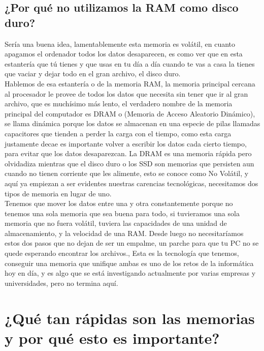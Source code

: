 \documentclass{article}
\begin{document}
\subsection{¿Por qué no utilizamos la RAM como disco duro?}

Sería una buena idea, lamentablemente esta memoria es volátil, en cuanto apagamos el ordenador todos los datos desaparecen, es como ver que en esta estantería que tú tienes y que usas en tu día a día cuando te vas a casa la tienes que vaciar y dejar todo en el gran archivo, el disco duro.\\

Hablemos de esa estantería o de la memoria RAM, la memoria principal cercana al procesador le provee de todos los datos que necesita sin tener que ir al gran archivo, que es muchísimo más lento, el verdadero nombre de la memoria principal del computador es DRAM o (Memoria de Acceso Aleatorio Dinámico), se llama dinámica porque los datos se almacenan en una especie de pilas llamadas capacitores que tienden a perder la carga con el tiempo, como esta carga justamente decae es importante volver a escribir los datos cada cierto tiempo, para evitar que los datos desaparezcan. La DRAM es una memoria rápida pero olvidadiza mientras que el disco duro o los SSD son memorias que persisten aun cuando no tienen corriente que les alimente, esto se conoce como No Volátil, y aquí ya empiezan a ser evidentes nuestras carencias tecnológicas, necesitamos dos tipos de memoria en lugar de uno.\\

Tenemos que mover los datos entre una y otra constantemente porque no tenemos una sola memoria que sea buena para todo, si tuvieramos una sola memoria que no fuera volátil, tuviera las capacidades de una unidad de almacenamiento, y la velocidad de una RAM. Desde luego no necesitaríamos estos dos pasos que no dejan de ser un empalme, un parche para que tu PC no se quede esperando encontrar los archivos., Esta es la tecnología que tenemos, conseguir una memoria que unifique ambas es uno de los retos de la informática hoy en día, y es algo que se está investigando actualmente por varias empresas y universidades, pero no termina aquí.\\

\section{¿Qué tan rápidas son las memorias y por qué esto es importante?}
\end{document}
